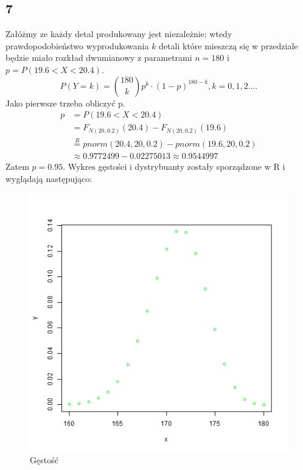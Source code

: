 \documentclass{article}
\begin{document}
\subsection*{7}
Załóżmy ze każdy detal produkowany jest niezależnie; wtedy prawdopodobieństwo wyprodukowania $k$ detali 
które mieszczą się w przedziale będzie miało rozkład dwumianowy z parametrami $n = 180$ i $p = P(19.6<X<20.4)$.
\[
	P(Y=k) = \binom{180}{k}p^k\cdot(1-p)^{180-k}, k=0,1,2\dots.
\]
Jako pierwsze trzeba obliczyć p. 
\begin{align*}
p & = P(19.6<X<20.4) \\
& = F_{N(20,0.2)}(20.4) - F_{N(20,0.2)}(19.6)  \\
& \overset{R}{=} pnorm(20.4,20,0.2) - pnorm(19.6,20,0.2)  \\
& \approx 0.9772499 - 0.02275013 \approx 0.9544997
\end{align*}
Zatem $p = 0.95$. 
Wykres gęstości i dystrybuanty zostały sporządzone w R i wyglądają następująco:
\newpage
\begin{figure}[h!]
\begin{center}
\includegraphics[height=0.4\textheight, angle=0]{"lab4zad1_d.png"}
\caption{Gęstość}
\end{center}
\end{figure}
\end{document}
